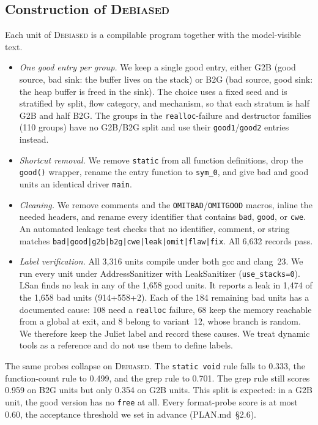 \documentclass[conference]{IEEEtran}
\newcommand{\Deb}{\textsc{Debiased}}
\newcommand{\code}[1]{\texttt{#1}}
\begin{document}
\subsection{Construction of \Deb{}}
Each unit of \Deb{} is a compilable program together with the model-visible text.
\begin{itemize}
\item \emph{One good entry per group.} We keep a single good entry, either G2B (good source, bad sink: the buffer lives on the stack) or B2G (bad source, good sink: the heap buffer is freed in the sink). The choice uses a fixed seed and is stratified by split, flow category, and mechanism, so that each stratum is half G2B and half B2G. %
The groups in the \code{realloc}-failure and destructor families (110 groups) have no G2B/B2G split and use their \code{good1}/\code{good2} entries instead. %
\item \emph{Shortcut removal.} We remove \code{static} from all function definitions, drop the \code{good()} wrapper, rename the entry function to \code{sym\_0}, and give bad and good units an identical driver \code{main}.
\item \emph{Cleaning.} We remove comments and the \code{OMITBAD}/\code{OMITGOOD} macros, inline the needed headers, and rename every identifier that contains \code{bad}, \code{good}, or \code{cwe}. An automated leakage test checks that no identifier, comment, or string matches \code{bad|good|g2b|b2g|cwe|leak|omit|flaw|fix}. All 6,632 records pass. %
\item \emph{Label verification.} All 3,316 units compile under both gcc and clang~23. %
We run every unit under AddressSanitizer with LeakSanitizer (\code{use\_stacks=0}). LSan finds no leak in any of the 1,658 good units. %
It reports a leak in 1,474 of the 1,658 bad units (914+558+2). %
Each of the 184 remaining bad units has a documented cause: 108 need a \code{realloc} failure, 68 keep the memory reachable from a global at exit, and 8 belong to variant~12, whose branch is random. %
We therefore keep the Juliet label and record these causes. We treat dynamic tools as a reference and do not use them to define labels.
\end{itemize}
The same probes collapse on \Deb{}. The \code{static void} rule falls to 0.333, the function-count rule to 0.499, and the grep rule to 0.701. %
The grep rule still scores 0.959 on B2G units but only 0.354 on G2B units. %
This split is expected: in a G2B unit, the good version has no \code{free} at all.
Every format-probe score is at most 0.60, the acceptance threshold we set in advance (PLAN.md~\S2.6). %
\end{document}
